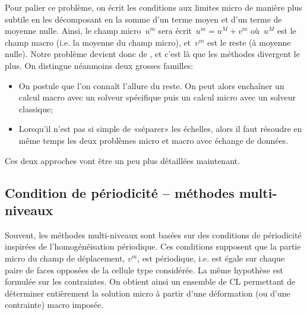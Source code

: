 
Pour palier ce problème, on écrit les conditions aux limites micro de manière plus subtile en les décomposant
en la somme d'un terme moyen et d'un terme de moyenne nulle. Ainsi, le champ micro~$u^m$
sera écrit~$u^m=u^M +v^m$ où~$u^M$ est le champ macro (i.e. la moyenne du champ micro),
et~$v^m$ est le reste (à moyenne nulle).
Notre problème devient donc de , et c'est là
que les méthodes divergent le plus. On distingue néanmoins deux grosses familles:
\begin{itemize}
  \item {}

	On postule que l'on connaît l'allure du reste. On peut alors enchaîner un calcul macro
	avec un solveur spécifique puis un calcul micro avec un solveur classique;
  \item {}

	Lorsqu'il n'est pas si simple de «séparer» les échelles, alors il faut résoudre
	en même temps les deux problèmes micro et macro avec échange de données.
\end{itemize}
Ces deux approches vont être un peu plus détaillées maintenant.




\medskip
\subsection{Condition de périodicité -- méthodes multi-niveaux}

Souvent, les méthodes multi-niveaux sont basées sur des conditions de périodicité
inspirées de l'homogénéisation périodique.
Ces conditions supposent que la partie micro du champ de déplacement, $v^m$, est périodique,
i.e. est égale sur chaque paire de faces opposées de la cellule type considérée.
La même hypothèse est formulée sur les contraintes.
On obtient ainsi un ensemble de CL permettant de déterminer entièrement la solution micro à
partir d'une déformation (ou d'une contrainte) macro imposée.


